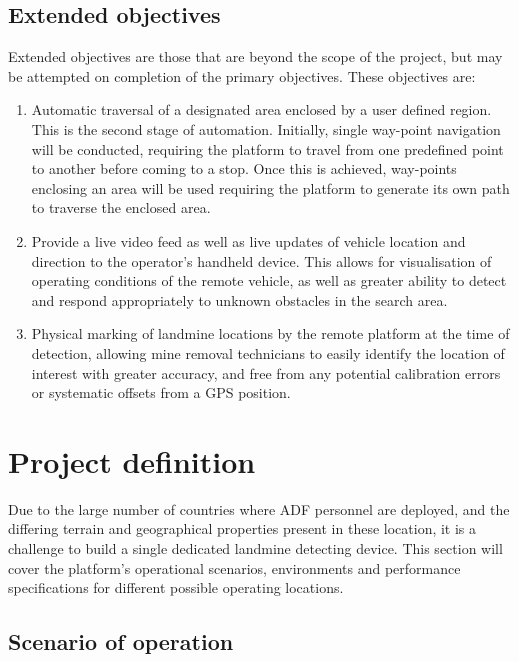 \documentclass[main.tex]{subfiles}
\begin{document}
\subsection{Extended objectives}
Extended objectives are those that are beyond the scope of the project, but may be attempted on completion of the primary objectives. These objectives are:

\begin{enumerate}
\item Automatic traversal of a designated area enclosed by a user defined region. This is the second stage of automation. Initially, single way-point navigation will be conducted, requiring the platform to travel from one predefined point to another before coming to a stop. Once this is achieved, way-points enclosing an area will be used requiring the platform to generate its own path to traverse the enclosed area.
\item Provide a live video feed as well as live updates of vehicle location and direction to the operator's handheld device. This allows for visualisation of operating conditions of the remote vehicle, as well as greater ability to detect and respond appropriately to unknown obstacles in the search area.
\item Physical marking of landmine locations by the remote platform at the time of detection, allowing mine removal technicians to easily identify the location of interest with greater accuracy, and free from any potential calibration errors or systematic offsets from a GPS position.
\end{enumerate}

\section{Project definition}
Due to the large number of countries where ADF personnel are deployed, and the differing terrain and geographical properties present in these location, it is a challenge to build a single dedicated landmine detecting device. This section will cover the platform's operational scenarios, environments and performance specifications for different possible operating locations. 

\subsection{Scenario of operation}
\end{document}
